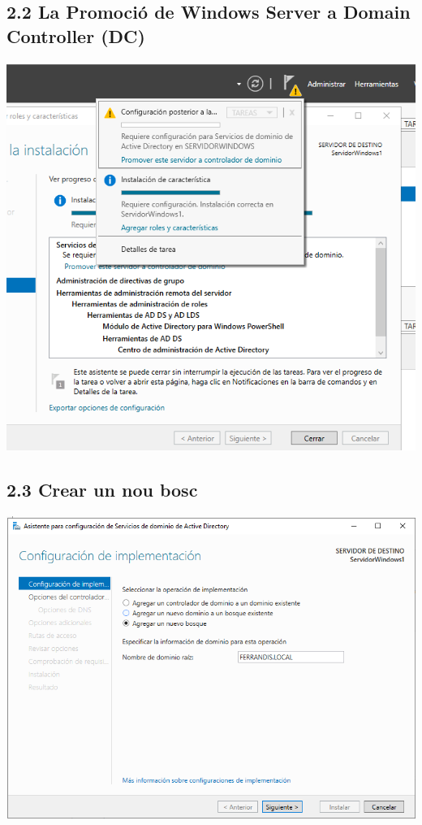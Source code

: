 \documentclass[
  a4paper,
]{article}
\begin{document}
\subsection{2.2 La Promoció de Windows Server a Domain Controller
(DC)}\label{la-promociuxf3-de-windows-server-a-domain-controller-dc}

\includegraphics{png/instalADFi.png}

\subsection{2.3 Crear un nou bosc}\label{crear-un-nou-bosc}

\includegraphics{png/noubosc.png}
\end{document}
